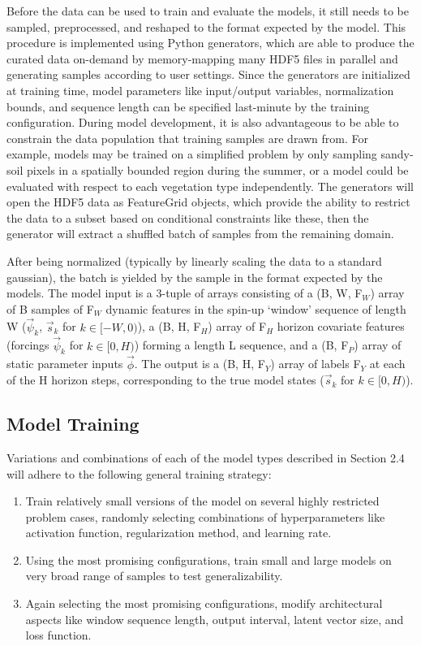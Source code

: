 \documentclass[11pt]{article}
\begin{document}
\begin{multicols}{2}
    Before the data can be used to train and evaluate the models, it still needs to be sampled, preprocessed, and reshaped to the format expected by the model. This procedure is implemented using Python generators, which are able to produce the curated data on-demand by memory-mapping many HDF5 files in parallel and generating samples according to user settings. Since the generators are initialized at training time, model parameters like input/output variables, normalization bounds, and sequence length can be specified last-minute by the training configuration. During model development, it is also advantageous to be able to constrain the data population that training samples are drawn from. For example, models may be trained on a simplified problem by only sampling sandy-soil pixels in a spatially bounded region during the summer, or a model could be evaluated with respect to each vegetation type independently. The generators will open the HDF5 data as FeatureGrid objects, which provide the ability to restrict the data to a subset based on conditional constraints like these, then the generator will extract a shuffled batch of samples from the remaining domain.

    After being normalized (typically by linearly scaling the data to a standard gaussian), the batch is yielded by the sample in the format expected by the models. The model input is a 3-tuple of arrays consisting of a (B, W, F$_W$) array of B samples of F$_W$ dynamic features in the spin-up `window' sequence of length W ($\vec{\psi}_k$, $\vec{s}_k$ for $k \in [-W,0)$), a (B, H, F$_H$) array of F$_H$ horizon covariate features (forcings $\vec{\psi}_k$ for $k \in [0,H)$) forming a length L sequence, and a (B, F$_P$) array of static parameter inputs $\vec{\phi}$. The output is a (B, H, F$_Y$) array of labels F$_Y$ at each of the H horizon steps, corresponding to the true model states ($\vec{s}_k$ for $k \in [0,H)$).

    \subsection{Model Training}

    Variations and combinations of each of the model types described in Section 2.4 will adhere to the following general training strategy:

    \begin{enumerate}
        \item Train relatively small versions of the model on several highly restricted problem cases, randomly selecting combinations of hyperparameters like activation function, regularization method, and learning rate.
        \item Using the most promising configurations, train small and large models on very broad range of samples to test generalizability.
        \item Again selecting the most promising configurations, modify architectural aspects like window sequence length, output interval, latent vector size, and loss function.
    \end{enumerate}


\end{multicols}
\end{document}
